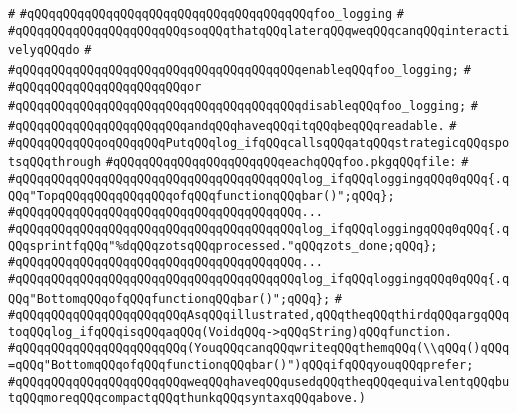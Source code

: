 \verb|#|\newline
\verb|#qQQqqQQqqQQqqQQqqQQqqQQqqQQqqQQqqQQqqQQqfoo_logging|\newline
\verb|#|\newline
\verb|#qQQqqQQqqQQqqQQqqQQqqQQqsoqQQqthatqQQqlaterqQQqweqQQqcanqQQqinteractivelyqQQqdo|\newline
\verb|#|\newline
\verb|#qQQqqQQqqQQqqQQqqQQqqQQqqQQqqQQqqQQqqQQqenableqQQqfoo_logging;|\newline
\verb|#|\newline
\verb|#qQQqqQQqqQQqqQQqqQQqqQQqor|\newline
\verb|#qQQqqQQqqQQqqQQqqQQqqQQqqQQqqQQqqQQqqQQqdisableqQQqfoo_logging;|\newline
\verb|#|\newline
\verb|#qQQqqQQqqQQqqQQqqQQqqQQqandqQQqhaveqQQqitqQQqbeqQQqreadable.|\newline
\verb|#|\newline
\verb|#qQQqqQQqqQQqoqQQqqQQqPutqQQqlog_ifqQQqcallsqQQqatqQQqstrategicqQQqspotsqQQqthrough|\newline
\verb|#qQQqqQQqqQQqqQQqqQQqqQQqeachqQQqfoo.pkgqQQqfile:|\newline
\verb|#|\newline
\verb|#qQQqqQQqqQQqqQQqqQQqqQQqqQQqqQQqqQQqqQQqlog_ifqQQqloggingqQQq0qQQq{.qQQq"TopqQQqqQQqqQQqqQQqofqQQqfunctionqQQqbar()";qQQq};|\newline
\verb|#qQQqqQQqqQQqqQQqqQQqqQQqqQQqqQQqqQQqqQQq...|\newline
\verb|#qQQqqQQqqQQqqQQqqQQqqQQqqQQqqQQqqQQqqQQqlog_ifqQQqloggingqQQq0qQQq{.qQQqsprintfqQQq"%dqQQqzotsqQQqprocessed."qQQqzots_done;qQQq};|\newline
\verb|#qQQqqQQqqQQqqQQqqQQqqQQqqQQqqQQqqQQqqQQq...|\newline
\verb|#qQQqqQQqqQQqqQQqqQQqqQQqqQQqqQQqqQQqqQQqlog_ifqQQqloggingqQQq0qQQq{.qQQq"BottomqQQqofqQQqfunctionqQQqbar()";qQQq};|\newline
\verb|#|\newline
\verb|#qQQqqQQqqQQqqQQqqQQqqQQqAsqQQqillustrated,qQQqtheqQQqthirdqQQqargqQQqtoqQQqlog_ifqQQqisqQQqaqQQq(VoidqQQq->qQQqString)qQQqfunction.|\newline
\verb|#qQQqqQQqqQQqqQQqqQQqqQQq(YouqQQqcanqQQqwriteqQQqthemqQQq(\\qQQq()qQQq=qQQq"BottomqQQqofqQQqfunctionqQQqbar()")qQQqifqQQqyouqQQqprefer;|\newline
\verb|#qQQqqQQqqQQqqQQqqQQqqQQqweqQQqhaveqQQqusedqQQqtheqQQqequivalentqQQqbutqQQqmoreqQQqcompactqQQqthunkqQQqsyntaxqQQqabove.)|\newline

